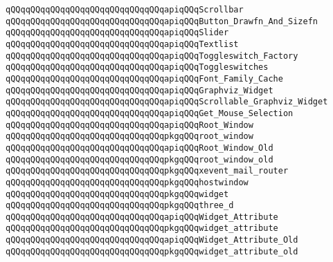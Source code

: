 \verb|qQQqqQQqqQQqqQQqqQQqqQQqqQQqqQQqapiqQQqScrollbar|\newline
\verb|qQQqqQQqqQQqqQQqqQQqqQQqqQQqqQQqapiqQQqButton_Drawfn_And_Sizefn|\newline
\verb|qQQqqQQqqQQqqQQqqQQqqQQqqQQqqQQqapiqQQqSlider|\newline
\verb|qQQqqQQqqQQqqQQqqQQqqQQqqQQqqQQqapiqQQqTextlist|\newline
\verb|qQQqqQQqqQQqqQQqqQQqqQQqqQQqqQQqapiqQQqToggleswitch_Factory|\newline
\verb|qQQqqQQqqQQqqQQqqQQqqQQqqQQqqQQqapiqQQqToggleswitches|\newline
\verb|qQQqqQQqqQQqqQQqqQQqqQQqqQQqqQQqapiqQQqFont_Family_Cache|\newline
\verb|qQQqqQQqqQQqqQQqqQQqqQQqqQQqqQQqapiqQQqGraphviz_Widget|\newline
\verb|qQQqqQQqqQQqqQQqqQQqqQQqqQQqqQQqapiqQQqScrollable_Graphviz_Widget|\newline
\verb|qQQqqQQqqQQqqQQqqQQqqQQqqQQqqQQqapiqQQqGet_Mouse_Selection|\newline
\newline
\verb|qQQqqQQqqQQqqQQqqQQqqQQqqQQqqQQqapiqQQqRoot_Window|\newline
\verb|qQQqqQQqqQQqqQQqqQQqqQQqqQQqqQQqpkgqQQqroot_window|\newline
\newline
\verb|qQQqqQQqqQQqqQQqqQQqqQQqqQQqqQQqapiqQQqRoot_Window_Old|\newline
\verb|qQQqqQQqqQQqqQQqqQQqqQQqqQQqqQQqpkgqQQqroot_window_old|\newline
\newline
\verb|qQQqqQQqqQQqqQQqqQQqqQQqqQQqqQQqpkgqQQqxevent_mail_router|\newline
\verb|qQQqqQQqqQQqqQQqqQQqqQQqqQQqqQQqpkgqQQqhostwindow|\newline
\verb|qQQqqQQqqQQqqQQqqQQqqQQqqQQqqQQqpkgqQQqwidget|\newline
\verb|qQQqqQQqqQQqqQQqqQQqqQQqqQQqqQQqpkgqQQqthree_d|\newline
\newline
\verb|qQQqqQQqqQQqqQQqqQQqqQQqqQQqqQQqapiqQQqWidget_Attribute|\newline
\verb|qQQqqQQqqQQqqQQqqQQqqQQqqQQqqQQqpkgqQQqwidget_attribute|\newline
\newline
\verb|qQQqqQQqqQQqqQQqqQQqqQQqqQQqqQQqapiqQQqWidget_Attribute_Old|\newline
\verb|qQQqqQQqqQQqqQQqqQQqqQQqqQQqqQQqpkgqQQqwidget_attribute_old|\newline
